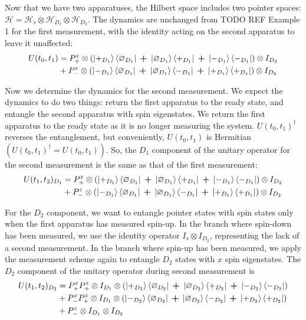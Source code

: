 Now that we have two apparatuses, the Hilbert space includes two pointer spaces: $\mathcal{H} = \mathcal{H}_s \otimes \mathcal{H}_{D_1} \otimes \mathcal{H}_{D_2}$. The dynamics are unchanged from TODO REF Example 1 for the first measurement, with the identity acting on the second apparatus to leave it unaffected:
\begin{align}
  U(t_0, t_1) &= P^z_+ \otimes \left(\ket{+_{D_1}}\bra{\varnothing_{D_1}} \: \bm{+} \: \ket{\varnothing_{D_1}}\bra{+_{D_1}} \: \bm{+} \: \ket{-_{D_1}}\bra{-_{D_1}} \right) \otimes I_{D_2} \\ \nonumber
    &+ P^z_- \otimes \left(\ket{-_{D_1}}\bra{\varnothing_{D_1}} \: \bm{+} \: \ket{\varnothing_{D_1}}\bra{-_{D_1}} \: \bm{+} \: \ket{+_{D_1}}\bra{+_{D_1}} \right) \otimes I_{D_2}
\end{align}

Now we determine the dynamics for the second measurement. We expect the dynamics to do two things: return the first apparatus to the ready state, and entangle the second apparatus with spin eigenstates. We return the first apparatus to the ready state as it is no longer measuring the system. $U(t_0, t_1)^\dagger$ reverses the entanglement, but conveniently, $U(t_0, t_1)$ is Hermitian $\left(U(t_0, t_1)^\dagger = U(t_0, t_1)\right)$. So, the $D_1$ component of the unitary operator for the second measurement is the same as that of the first measurement:
\begin{align}
  U(t_1, t_2)_{D_1} &= P^z_+ \otimes \left(\ket{+_{D_1}}\bra{\varnothing_{D_1}} \: \bm{+} \: \ket{\varnothing_{D_1}}\bra{+_{D_1}} \: \bm{+} \: \ket{-_{D_1}}\bra{-_{D_1}} \right) \otimes I_{D_2}  \\ \nonumber
    &+ P^z_- \otimes \left(\ket{-_{D_1}}\bra{\varnothing_{D_1}} \: \bm{+} \: \ket{\varnothing_{D_1}}\bra{-_{D_1}} \: \bm{+} \: \ket{+_{D_1}}\bra{+_{D_1}} \right) \otimes I_{D_2}
\end{align}

For the $D_2$ component, we want to entangle pointer states with spin states only when the first apparatus has measured spin-up. In the branch where spin-down has been measured, we use the identity operator $I_s \otimes I_{D_2}$, representing the lack of a second measurement. In the branch where spin-up has been measured, we apply the measurement scheme again to entangle $D_2$ states with $x$ spin eigenstates. The $D_2$ component of the unitary operator during second measurement is
\begin{align}
  U(t_1, t_2)_{D_2} &= P^x_+ P^z_+ \otimes I_{D_1} \otimes \left(\ket{+_{D_2}}\bra{\varnothing_{D_2}} \: \bm{+} \: \ket{\varnothing_{D_2}}\bra{+_{D_2}} \: \bm{+} \: \ket{-_{D_2}}\bra{-_{D_2}} \right) \\ \nonumber
  &+ P^x_- P^z_+ \otimes I_{D_1} \otimes \left(\ket{-_{D_2}}\bra{\varnothing_{D_2}} \: \bm{+} \: \ket{\varnothing_{D_2}}\bra{-_{D_2}} \: \bm{+} \: \ket{+_{D_2}}\bra{+_{D_2}} \right)\\ \nonumber
  &+ P^z_- \otimes I_{D_1} \otimes I_{D_2}
\end{align}



